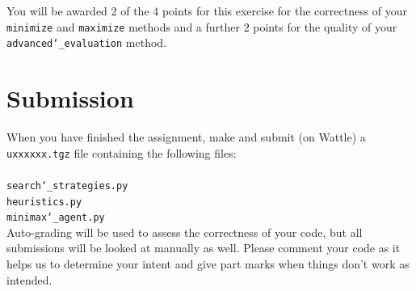 \documentclass[12pt]{article}
\begin{document}
You will be awarded $2$ of the $4$ points for this exercise for the correctness of your
\texttt{minimize} and \texttt{maximize} methods and a further $2$ points for the
quality of your \texttt{advanced\char`_evaluation} method.


%
%

\section{Submission}

When you have finished the assignment, make and submit (on Wattle) a \texttt{uxxxxxx.tgz} file containing 
the following files:\\
\\
\texttt{search\char`_strategies.py}\\
\texttt{heuristics.py}\\
\texttt{minimax\char`_agent.py}\\

Auto-grading will be used to assess the correctness of your code, but all submissions
will be looked at manually as well. Please comment your code as it helps us to
determine your intent and give part marks when things don't work as intended.



%
%
\end{document}

